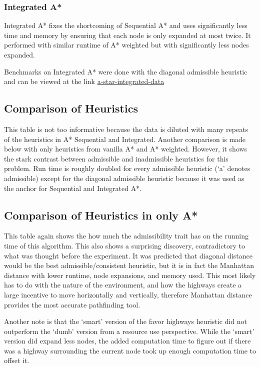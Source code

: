 \documentclass[11pt,letter]{article}
\begin{document}
\subsubsection{Integrated A*}
Integrated A* fixes the shortcoming of Sequential A* and uses significantly less time and memory by ensuring that each node is only expanded at most twice. It performed with similar runtime of A* weighted but with significantly less nodes expanded. \\
\par
Benchmarks on Integrated A* were done with the diagonal admissible heuristic and can be viewed at the link \href{https://docs.google.com/spreadsheets/d/1ZdutLyAf5Jvw3L9p1cG2fGdi5LS3Mg2Jx-hI8yP902E/edit#gid=1796117023}{a-star-integrated-data}

\subsection{Comparison of Heuristics}
\par
This table is not too informative because the data is diluted with many repeats of the heuristics in A* Sequential and Integrated. Another comparison is made below with only heuristics from vanilla A* and A* weighted. However, it shows the stark contrast between admissible and inadmissible heuristics for this problem. Run time is roughly doubled for every admissible heuristic (`a' denotes admissible) except for the diagonal admissible heuristic because it was used as the anchor for Sequential and Integrated A*.
\subsection{Comparison of Heuristics in only A*}
\par
This table again shows the how much the admissibility trait has on the running time of this algorithm. This also shows a surprising discovery, contradictory to what was thought before the experiment. It was predicted that diagonal distance would be the best admissible/consistent heuristic, but it is in fact the Manhattan distance with lower runtime, node expansions, and memory used. This most likely has to do with the nature of the environment, and how the highways create a large incentive to move horizontally and vertically, therefore Manhattan distance provides the most accurate pathfinding tool.\par
Another note is that the `smart' version of the favor highways heuristic did not outperform the `dumb' version from a resource use perspective. While the `smart' version did expand less nodes, the added computation time to figure out if there was a highway surrounding the current node took up enough computation time to offset it.
\end{document}
